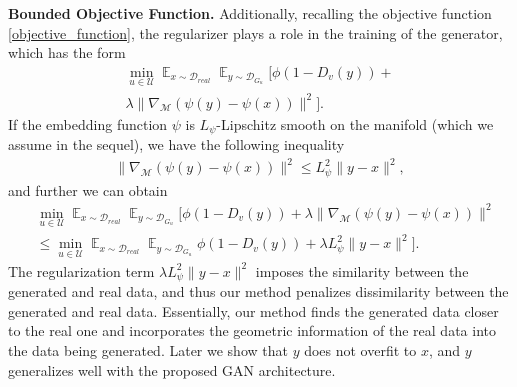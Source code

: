 \documentclass[10pt,twocolumn,letterpaper]{article}
\newcommand{\nn}{\nonumber}
\newcommand{\g}{{G_u}}
\newcommand{\di}{{D_v}}
\newcommand{\U}{\mathcal{U}}
\newcommand{\D}{\mathcal{D}}
\newcommand{\E}{\mathbb{E}}
\newcommand{\M}{\mathcal{M}}
\begin{document}
{{\textbf{Bounded Objective Function.}}
	Additionally, recalling the objective function \eqref{objective_function}, the regularizer plays a role in the training of the generator, which has the form
	\begin{align}
	\min_{u\in \U}  \mathop{\E}_{x\sim \D_{real}}\mathop{\E}_{y\sim \D_{\g}} [\phi(1-\di(y))+\nn\\\lambda \|\nabla_\M (\psi(y)-\psi(x))\|^2].
	\end{align}
	If the embedding function $\psi$ is $L_\psi$-Lipschitz smooth on the manifold (which we assume in the sequel), we have the following inequality
	\begin{align}
	\|\nabla_\M (\psi(y)-\psi(x))\|^2  \le L_\psi^2 \|y-x\|^2,
	\end{align}
	and further we can obtain
	\begin{align}
	&	\min_{u\in \U}  \mathop{\E}_{x\sim \D_{real}}\mathop{\E}_{y\sim \D_{\g}} \!\![\phi(1\!-\!\di(y))\!+\!\lambda \|\nabla_\M (\psi(y)\!-\!\psi(x))\|^2 \nn\\
	&\le \min_{u\in \U}  \mathop{\E}_{x\sim \D_{real}}\mathop{\E}_{y\sim \D_{\g}} \phi(1-\di(y))+\lambda L_\psi^2 \|y-x\|^2].\nonumber
	\end{align}
	The regularization term $\lambda L_\psi^2 \|y-x\|^2$ imposes the similarity between the generated and real data, and thus our method penalizes dissimilarity between the generated and real data. Essentially, our method finds the generated data closer to the real one and incorporates the geometric information of the real data into the data being generated.} Later we show that $y$ does not overfit to $x$, and $y$ generalizes well with the proposed GAN architecture.
\end{document}
